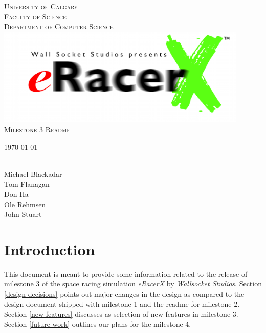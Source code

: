 \documentclass[11pt]{article}
\begin{document}
\begin{titlepage}
\begin{center}
\textsc{
%
University of Calgary\\
Faculty of Science\\
Department of Computer Science\\ 
}
\vspace{3cm}
%
%
{
\includegraphics[width=12cm]{img/eRacerX-Logo.png}\\
\textsc{
\Huge
Milestone 3 Readme
}
}
\vspace{5mm}


\vspace{5mm}
{
 \today \\
 \ \\
 }
%
\vfill %
%
%
\begin{flushright} 
Michael Blackadar \\
\vspace{3mm}
Tom Flanagan\\
\vspace{3mm}
Don Ha\\
\vspace{3mm}
Ole Rehmsen\\
\vspace{3mm}
John Stuart
\end{flushright}



\end{center}
\end{titlepage}

\label{introduction}
\section{Introduction}

This document is meant to provide some information related to the release of milestone 3 of the space racing simulation \emph{eRacerX} by \emph{Wallsocket Studios}. Section \ref{design-decisions} points out major changes in the design as compared to the design document shipped with milestone 1 and the readme for milestone 2. Section \ref{new-features} discusses as selection of new features in milestone 3. Section \ref{future-work} outlines our plans for the milestone 4.
\end{document}
